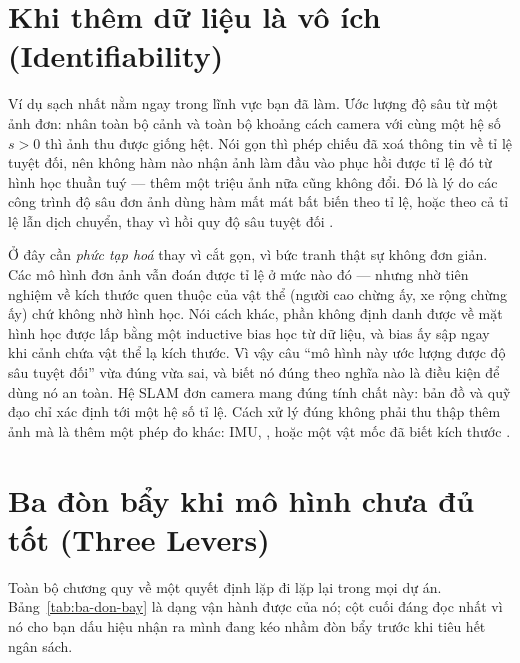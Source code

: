 \documentclass[../../deep_learning.tex]{subfiles}
\begin{document}
\section{Khi thêm dữ liệu là vô ích (Identifiability)}
Ví dụ sạch nhất nằm ngay trong lĩnh vực bạn đã làm. Ước lượng độ sâu từ một ảnh đơn: nhân toàn bộ cảnh và toàn bộ khoảng cách camera với cùng một hệ số \(s>0\) thì ảnh thu được giống hệt. Nói gọn thì phép chiếu đã xoá thông tin về tỉ lệ tuyệt đối, nên không hàm nào nhận ảnh làm đầu vào phục hồi được tỉ lệ đó từ hình học thuần tuý --- thêm một triệu ảnh nữa cũng không đổi. Đó là lý do các công trình độ sâu đơn ảnh dùng hàm mất mát bất biến theo tỉ lệ, hoặc theo cả tỉ lệ lẫn dịch chuyển, thay vì hồi quy độ sâu tuyệt đối \cite{eigen2014depth,ranftl2022midas}.

Ở đây cần \emph{phức tạp hoá} thay vì cắt gọn, vì bức tranh thật sự không đơn giản. Các mô hình đơn ảnh vẫn đoán được tỉ lệ ở mức nào đó --- nhưng nhờ tiên nghiệm về kích thước quen thuộc của vật thể (người cao chừng ấy, xe rộng chừng ấy) chứ không nhờ hình học. Nói cách khác, phần không định danh được về mặt hình học được lấp bằng một inductive bias học từ dữ liệu, và bias ấy sập ngay khi cảnh chứa vật thể lạ kích thước. Vì vậy câu ``mô hình này ước lượng được độ sâu tuyệt đối'' vừa đúng vừa sai, và biết nó đúng theo nghĩa nào là điều kiện để dùng nó an toàn. Hệ SLAM đơn camera mang đúng tính chất này: bản đồ và quỹ đạo chỉ xác định tới một hệ số tỉ lệ. Cách xử lý đúng không phải thu thập thêm ảnh mà là thêm một phép đo khác: IMU, , hoặc một vật mốc đã biết kích thước \cite{mur2017orbslam2}. 

\section{Ba đòn bẩy khi mô hình chưa đủ tốt (Three Levers)}
Toàn bộ chương quy về một quyết định lặp đi lặp lại trong mọi dự án. Bảng~\ref{tab:ba-don-bay} là dạng vận hành được của nó; cột cuối đáng đọc nhất vì nó cho bạn dấu hiệu nhận ra mình đang kéo nhầm đòn bẩy trước khi tiêu hết ngân sách.
\end{document}
